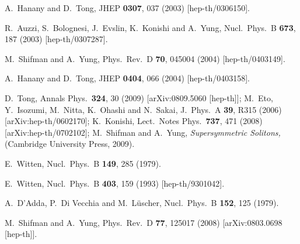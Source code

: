 \documentclass[epsfig,12pt]{article}
\begin{document}
{\newpage
\vspace{2.5cm}

\small
\begin{thebibliography}{99}
\itemsep -2pt

A.~Hanany and D.~Tong,
JHEP {\bf 0307}, 037 (2003)
[hep-th/0306150].

R.~Auzzi, S.~Bolognesi, J.~Evslin, K.~Konishi and A.~Yung,
Nucl.\ Phys.\ B {\bf 673}, 187 (2003)
[hep-th/0307287].

M.~Shifman and A.~Yung,
Phys.\ Rev.\ D {\bf 70}, 045004 (2004)
[hep-th/0403149].

A.~Hanany and D.~Tong,
JHEP {\bf 0404}, 066 (2004)
[hep-th/0403158].

D.~Tong,
  Annals Phys.\  {\bf 324}, 30 (2009)
  [arXiv:0809.5060 [hep-th]];
  M.~Eto, Y.~Isozumi, M.~Nitta, K.~Ohashi and N.~Sakai,
  J.\ Phys.\ A  {\bf 39}, R315 (2006)
  [arXiv:hep-th/0602170];
  K.~Konishi,
  Lect.\ Notes Phys.\  {\bf 737}, 471 (2008)
  [arXiv:hep-th/0702102];
M.~Shifman and A.~Yung,
{\sl Supersymmetric Solitons,}
(Cambridge University Press, 2009).

E.~Witten,
Nucl.\ Phys.\ B {\bf 149}, 285 (1979).

E.~Witten,
  Nucl.\ Phys.\ B {\bf 403}, 159 (1993)
  [hep-th/9301042].
  
  A.~D'Adda, P.~Di Vecchia and M.~L\"{u}scher,
  Nucl.\ Phys.\  B {\bf 152}, 125 (1979).
  
  M.~Shifman and A.~Yung,
  Phys.\ Rev.\  D {\bf 77}, 125017 (2008)
  [arXiv:0803.0698 [hep-th]].
  

\end{thebibliography}}
\end{document}
